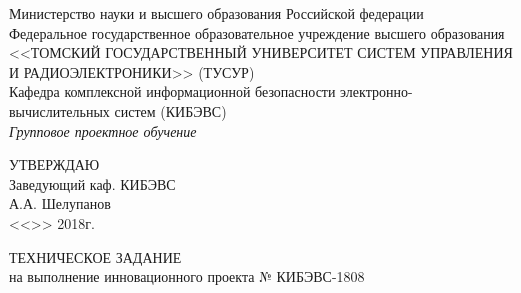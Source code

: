 \begin{center}
Министерство науки и высшего образования Российской федерации\\
Федеральное государственное образовательное учреждение высшего образования\\
<<ТОМСКИЙ ГОСУДАРСТВЕННЫЙ УНИВЕРСИТЕТ СИСТЕМ УПРАВЛЕНИЯ И РАДИОЭЛЕКТРОНИКИ>> (ТУСУР)\\
Кафедра комплексной информационной безопасности электронно-вычислительных систем (КИБЭВС)\\

\itshape{Групповое проектное обучение}\\
\end{center}

\vfill

\begin{flushright}
\begin{minipage}{0.45\textwidth}
 \begin{flushleft}
УТВЕРЖДАЮ\\
Заведующий каф. КИБЭВС\\
\underline{\hspace{2.5cm}} А.А. Шелупанов\\
<<\underline{\hspace{1cm}}>>\underline{\hspace{3cm}} 2018г.\\
 \end{flushleft}
\end{minipage}
\end{flushright}

\vfill

\begin{center}
ТЕХНИЧЕСКОЕ ЗАДАНИЕ\\
на выполнение инновационного проекта № КИБЭВС-1808\\
\end{center}

\vfill

